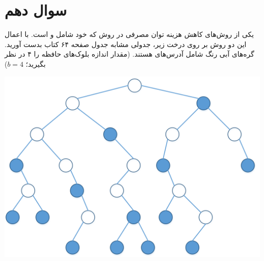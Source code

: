 \section{سوال دهم}

یکی از روش‌های کاهش هزینه توان مصرفی در  روش  که خود شامل  و  است. با اعمال این دو روش بر روی درخت زیر، جدولی مشابه جدول صفحه ۶۴ کتاب بدست آورید. گره‌های آبی رنگ شامل آدرس‌های  هستند. (مقدار اندازه بلوک‌های حافظه را ۴ در نظر بگیرید؛ $b=4 $)


\begin{center}
	\includegraphics*[width=0.5\linewidth]{pics/img2.png}
\end{center}


